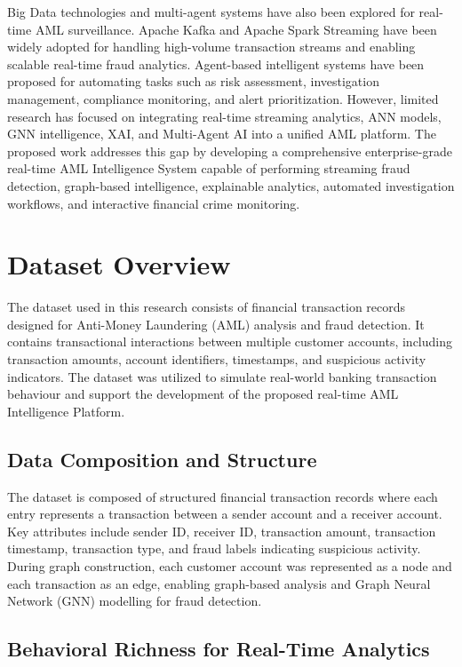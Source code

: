 \documentclass[conference]{IEEEtran}
\begin{document}
Big Data technologies and multi-agent systems have also been explored for real-time AML surveillance. Apache Kafka and Apache Spark Streaming have been widely adopted for handling high-volume transaction streams and enabling scalable real-time fraud analytics. Agent-based intelligent systems have been proposed for automating tasks such as risk assessment, investigation management, compliance monitoring, and alert prioritization. However, limited research has focused on integrating real-time streaming analytics, ANN models, GNN intelligence, XAI, and Multi-Agent AI into a unified AML platform. The proposed work addresses this gap by developing a comprehensive enterprise-grade real-time AML Intelligence System capable of performing streaming fraud detection, graph-based intelligence, explainable analytics, automated investigation workflows, and interactive financial crime monitoring.

\section{Dataset Overview}

The dataset used in this research consists of financial transaction records designed for Anti-Money Laundering (AML) analysis and fraud detection. It contains transactional interactions between multiple customer accounts, including transaction amounts, account identifiers, timestamps, and suspicious activity indicators. The dataset was utilized to simulate real-world banking transaction behaviour and support the development of the proposed real-time AML Intelligence Platform.

\subsection{Data Composition and Structure}

The dataset is composed of structured financial transaction records where each entry represents a transaction between a sender account and a receiver account. Key attributes include sender ID, receiver ID, transaction amount, transaction timestamp, transaction type, and fraud labels indicating suspicious activity. During graph construction, each customer account was represented as a node and each transaction as an edge, enabling graph-based analysis and Graph Neural Network (GNN) modelling for fraud detection.

\subsection{Behavioral Richness for Real-Time Analytics}
\end{document}
